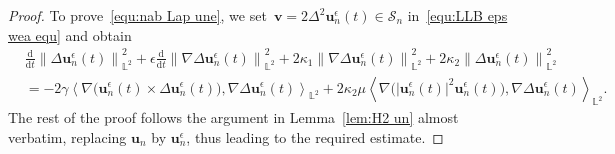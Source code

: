 \documentclass[11pt,reqno]{amsart}
\theoremstyle{definition}
\numberwithin{equation}{section}
\newcommand{\bff}{\boldsymbol}
\newcommand{\bb}{\mathbb}
\newcommand{\ddt}{\frac{\mathrm{d}}{\mathrm{d}t}}
\newcommand{\nn}{\nonumber}
\newcommand{\norm}[2]{\left\|{#1}\right\|_{#2}}
\newcommand{\inpro}[2]{\left\langle#1,#2\right\rangle}
\begin{document}
\begin{proof}
	To prove~\eqref{equ:nab Lap une}, we
	set~$\bff{v}=2\Delta^2\bff{u}_n^\epsilon(t)\in\mathcal{S}_n$
	in~\eqref{equ:LLB eps wea equ} and obtain
	\begin{align*}
		&\ddt\norm{\Delta\bff{u}_n^\epsilon(t)}{\bb{L}^2}^2
		+
		\epsilon\ddt\norm{\nabla\Delta\bff{u}_n^\epsilon(t)}{\bb{L}^2}^2
		+
		2\kappa_1\norm{\nabla\Delta\bff{u}_n^\epsilon(t)}{\bb{L}^2}^2
		+
		2\kappa_2 \norm{\Delta \bff{u}_n^\epsilon(t)}{\bb{L}^2}^2
		\nn\\
		&=
		-2\gamma
		\inpro{\nabla\Big(\bff{u}_n^\epsilon(t)\times\Delta\bff{u}_n^\epsilon(t)\Big)}
		{\nabla\Delta\bff{u}_n^\epsilon(t)}_{\bb{L}^2}
		+2\kappa_2\mu
		\inpro{\nabla\Big(|\bff{u}_n^\epsilon(t)|^2\bff{u}_n^\epsilon(t)\Big)}
		{\nabla\Delta\bff{u}_n^\epsilon(t)}_{\bb{L}^2}.
	\end{align*}
	The rest of the proof follows the argument in Lemma~\ref{lem:H2 un} almost verbatim, replacing $\bff{u}_n$ by $\bff{u}_n^\epsilon$, thus leading to the required estimate.
\end{proof}
\end{document}
